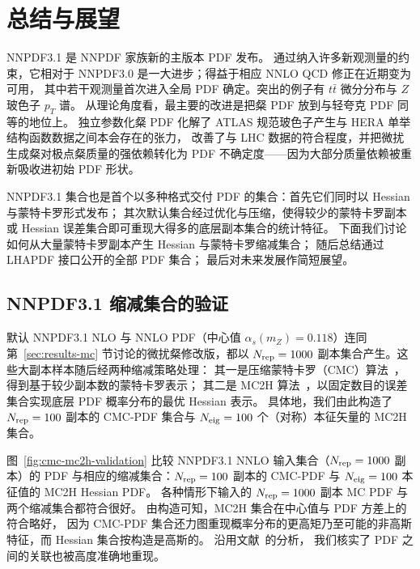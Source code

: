 \section{总结与展望}
\label{sec:conclusion}
NNPDF3.1 是 NNPDF 家族新的主版本 PDF 发布。
%
通过纳入许多新观测量的约束，它相对于 NNPDF3.0 是一大进步；得益于相应 NNLO QCD 修正在近期变为可用，
其中若干观测量首次进入全局 PDF 确定。突出的例子有 $t\bar{t}$ 微分分布与 $Z$ 玻色子 $p_T$ 谱。
%
从理论角度看，最主要的改进是把粲 PDF 放到与轻夸克 PDF 同等的地位上。
%
独立参数化粲 PDF 化解了 ATLAS 规范玻色子产生与 HERA 单举结构函数数据之间本会存在的张力，
改善了与 LHC 数据的符合程度，并把微扰生成粲对极点粲质量的强依赖转化为 PDF 不确定度——因为大部分质量依赖被重新吸收进初始 PDF 形状。

NNPDF3.1 集合也是首个以多种格式交付 PDF 的集合：首先它们同时以 Hessian 与蒙特卡罗形式发布；
其次默认集合经过优化与压缩，使得较少的蒙特卡罗副本或 Hessian 误差集合即可重现大得多的底层副本集合的统计特征。
下面我们讨论如何从大量蒙特卡罗副本产生 Hessian 与蒙特卡罗缩减集合；
随后总结通过 LHAPDF 接口公开的全部 PDF 集合；
最后对未来发展作简短展望。

\subsection{NNPDF3.1 缩减集合的验证}
\label{sec:compression}

  默认 NNPDF3.1 NLO 与 NNLO PDF（中心值 $\alpha_s(m_Z)=0.118$）连同第~\ref{sec:results-mc}
  节讨论的微扰粲修改版，都以 $N_{\rm rep}=1000$ 副本集合产生。这些大副本样本随后经两种缩减策略处理：
  其一是压缩蒙特卡罗（CMC）算法~\cite{Carrazza:2015hva}，得到基于较少副本数的蒙特卡罗表示；
  其二是 MC2H 算法~\cite{Carrazza:2015aoa}，以固定数目的误差集合实现底层 PDF 概率分布的最优 Hessian 表示。
  具体地，我们由此构造了 $N_{\rm rep}=100$ 副本的 CMC-PDF 集合与 $N_{\rm eig}=100$ 个（对称）本征矢量的 MC2H 集合。

  图~\ref{fig:cmc-mc2h-validation} 比较 NNPDF3.1 NNLO 输入集合（$N_{\rm rep}=1000$ 副本）的 PDF
        与相应的缩减集合：$N_{\rm rep}=100$ 副本的 CMC-PDF 与 $N_{\rm eig}=100$
        本征值的 MC2H Hessian PDF。
        各种情形下输入的 $N_{\rm rep}=1000$ 副本 MC PDF 与两个缩减集合都符合很好。
        由构造可知，MC2H 集合在中心值与 PDF 方差上的符合略好，
        因为 CMC-PDF 集合还力图重现概率分布的更高矩乃至可能的非高斯特征，而 Hessian 集合按构造是高斯的。
        沿用文献~\cite{Carrazza:2015aoa,Carrazza:2015hva}的分析，
        我们核实了 PDF 之间的关联也被高度准确地重现。
        
